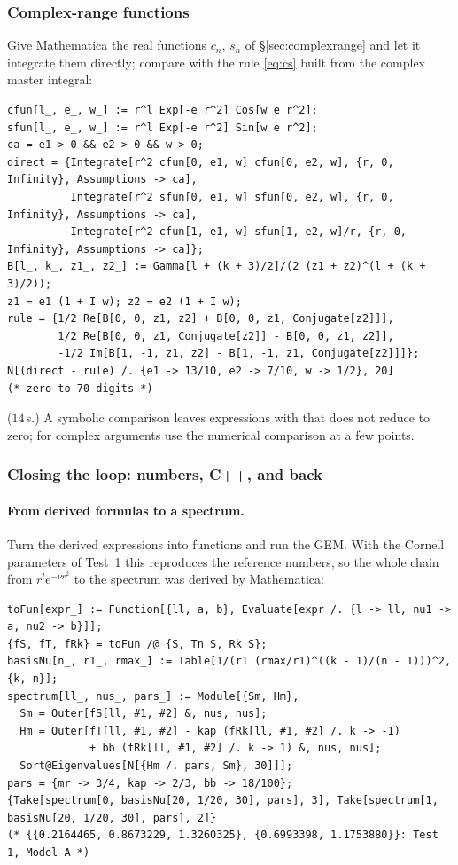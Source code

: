 \documentclass[11pt,a4paper]{article}
\numberwithin{equation}{section}
\theoremstyle{definition}
\theoremstyle{plain}
\theoremstyle{remark}
\numberwithin{algorithm}{section}
\newcommand{\ee}{\mathrm{e}}
\begin{document}
\subsubsection{Complex-range functions}
Give Mathematica the real functions $c_n$, $s_n$ of \S\ref{sec:complexrange} and let it integrate them directly; compare with the rule \eqref{eq:cs} built from the complex master integral:
\begin{lstlisting}[style=wl]
cfun[l_, e_, w_] := r^l Exp[-e r^2] Cos[w e r^2];
sfun[l_, e_, w_] := r^l Exp[-e r^2] Sin[w e r^2];
ca = e1 > 0 && e2 > 0 && w > 0;
direct = {Integrate[r^2 cfun[0, e1, w] cfun[0, e2, w], {r, 0, Infinity}, Assumptions -> ca],
          Integrate[r^2 sfun[0, e1, w] sfun[0, e2, w], {r, 0, Infinity}, Assumptions -> ca],
          Integrate[r^2 cfun[1, e1, w] sfun[1, e2, w]/r, {r, 0, Infinity}, Assumptions -> ca]};
B[l_, k_, z1_, z2_] := Gamma[l + (k + 3)/2]/(2 (z1 + z2)^(l + (k + 3)/2));
z1 = e1 (1 + I w); z2 = e2 (1 + I w);
rule = {1/2 Re[B[0, 0, z1, z2] + B[0, 0, z1, Conjugate[z2]]],
        1/2 Re[B[0, 0, z1, Conjugate[z2]] - B[0, 0, z1, z2]],
        -1/2 Im[B[1, -1, z1, z2] - B[1, -1, z1, Conjugate[z2]]]};
N[(direct - rule) /. {e1 -> 13/10, e2 -> 7/10, w -> 1/2}, 20]           (* zero to 70 digits *)
\end{lstlisting}
($14\,$s.) A symbolic comparison leaves expressions with  that  does not reduce to zero; for complex arguments use the numerical comparison at a few points.

\subsubsection{Closing the loop: numbers, C++, and back}
\paragraph{From derived formulas to a spectrum.} Turn the derived expressions into functions and run the GEM. With the Cornell parameters of Test~1 this reproduces the reference numbers, so the whole chain from $r^l\ee^{-\nu r^2}$ to the spectrum was derived by Mathematica:
\begin{lstlisting}[style=wl]
toFun[expr_] := Function[{ll, a, b}, Evaluate[expr /. {l -> ll, nu1 -> a, nu2 -> b}]];
{fS, fT, fRk} = toFun /@ {S, Tn S, Rk S};
basisNu[n_, r1_, rmax_] := Table[1/(r1 (rmax/r1)^((k - 1)/(n - 1)))^2, {k, n}];
spectrum[ll_, nus_, pars_] := Module[{Sm, Hm},
  Sm = Outer[fS[ll, #1, #2] &, nus, nus];
  Hm = Outer[fT[ll, #1, #2] - kap (fRk[ll, #1, #2] /. k -> -1)
             + bb (fRk[ll, #1, #2] /. k -> 1) &, nus, nus];
  Sort@Eigenvalues[N[{Hm /. pars, Sm}, 30]]];
pars = {mr -> 3/4, kap -> 2/3, bb -> 18/100};
{Take[spectrum[0, basisNu[20, 1/20, 30], pars], 3], Take[spectrum[1, basisNu[20, 1/20, 30], pars], 2]}
(* {{0.2164465, 0.8673229, 1.3260325}, {0.6993398, 1.1753880}}: Test 1, Model A *)
\end{lstlisting}
\end{document}

